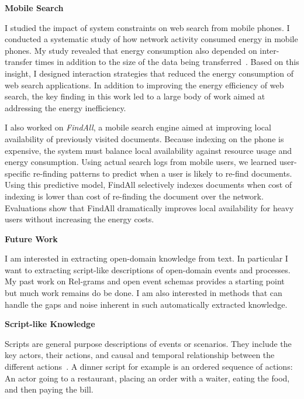 \documentclass[a4paper,11pt,onecolumn]{article}
\begin{document}
{\bf Mobile Search}

I studied the impact of system constraints on web search from mobile phones. I conducted a systematic study of how network activity consumed energy in mobile phones. My study revealed that energy consumption also depended on inter-transfer times in addition to the size of the data being transferred~\cite{balasubramanian-imc09}. Based on this insight, I designed interaction strategies that reduced the energy consumption of web search applications. In addition to improving the energy efficiency of web search, the key finding in this work led to a large body of work aimed at addressing the energy inefficiency.

I also worked on {\em FindAll}, a mobile search engine aimed at improving local availability of previously visited documents. Because indexing on the phone is expensive, the system must balance local availability against resource usage and energy consumption. Using actual search logs from mobile users, we learned user-specific re-finding patterns to predict when a user is likely to re-find documents. Using this predictive model, FindAll selectively indexes documents when cost of indexing is lower than cost of re-finding the document over the network. Evaluations show that FindAll dramatically improves local availability for heavy users without increasing the energy costs.

{\bf Future Work}

I am interested in extracting open-domain knowledge from text. In particular I want to extracting script-like descriptions of open-domain events and processes. My past work on Rel-grams and open event schemas provides a starting point but much work remains do be done. I am also interested in methods that can handle the gaps and noise inherent in such automatically extracted knowledge.

{\bf Script-like Knowledge}

Scripts are general purpose descriptions of events or scenarios. They include the key actors, their actions, and causal and temporal relationship between the different actions~\cite{schank-scripts75}. A dinner script for example is an ordered sequence of actions: An actor going to a restaurant, placing an order with a waiter, eating the food, and then paying the bill. 
\end{document}
